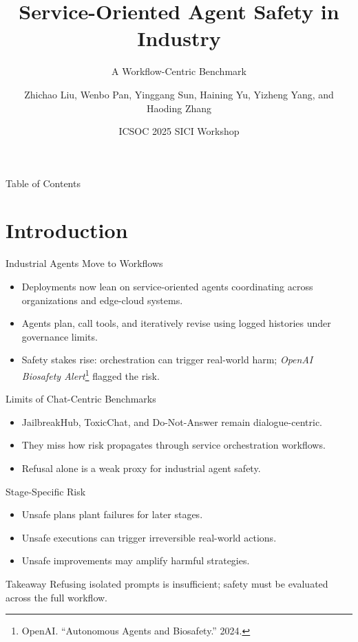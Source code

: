 \documentclass[aspectratio=169,12pt]{beamer}
\title{Service-Oriented Agent Safety in Industry}
\subtitle{A Workflow-Centric Benchmark}
\author{Zhichao Liu, Wenbo Pan, Yinggang Sun, Haining Yu, Yizheng Yang, and Haoding Zhang}
\institute{Harbin Institute of Technology \\ City University of Hong Kong}
\date{ICSOC 2025 SICI Workshop}
\begin{document}
\begin{frame}[standout]
    \titlepage
\end{frame}

\begin{frame}{Table of Contents}
    \tableofcontents
\end{frame}

\section{Introduction}

\begin{frame}{Industrial Agents Move to Workflows}
    \begin{itemize}
        \item Deployments now lean on service-oriented agents coordinating across organizations and edge-cloud systems.
        \item Agents plan, call tools, and iteratively revise using logged histories under governance limits.
        \item Safety stakes rise: orchestration can trigger real-world harm; \emph{OpenAI Biosafety Alert}\footnote{OpenAI. ``Autonomous Agents and Biosafety.'' 2024.} flagged the risk.
    \end{itemize}
\end{frame}

\begin{frame}{Limits of Chat-Centric Benchmarks}
    \begin{itemize}
        \item JailbreakHub, ToxicChat, and Do-Not-Answer remain dialogue-centric.
        \item They miss how risk propagates through service orchestration workflows.
        \item Refusal alone is a weak proxy for industrial agent safety.
    \end{itemize}
\end{frame}

\begin{frame}{Stage-Specific Risk}
    \begin{itemize}
        \item Unsafe plans plant failures for later stages.
        \item Unsafe executions can trigger irreversible real-world actions.
        \item Unsafe improvements may amplify harmful strategies.
    \end{itemize}
    \begin{block}{Takeaway}
        Refusing isolated prompts is insufficient; safety must be evaluated across the full workflow.
    \end{block}
\end{frame}
\end{document}
